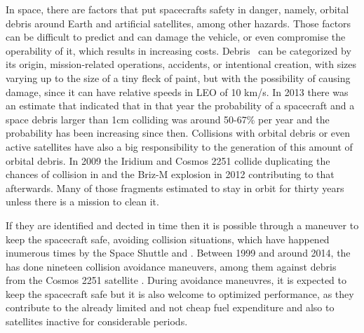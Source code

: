 In space, there are factors that put spacecrafts safety in danger, namely, orbital debris around Earth and artificial satellites, among other hazards. Those factors can be difficult to predict and can damage the vehicle, or even compromise the operability of it, which results in increasing costs. Debris~\cite{hall2014history} can be categorized by its origin, mission-related operations, accidents, or intentional creation, with sizes varying up to the size of a tiny fleck of paint, but with the possibility of causing damage, since it can have relative speeds in LEO of 10 km/s. In 2013 there was an estimate that indicated that in that year the probability of a spacecraft and a space debris larger than 1cm colliding was around 50-67\% \cite{sorokin2013earth} per year and the probability has been increasing since then. Collisions with orbital debris or even active satellites have also a big responsibility to the generation of this amount of orbital debris. In 2009 the Iridium and Cosmos 2251 collide duplicating the chances of collision in  \cite{wright2010current} and the Briz-M explosion in 2012 contributing to that afterwards\cite{hall2014history}. Many of those fragments estimated to stay in orbit for thirty years \cite{wang2010analysis} unless there is a mission to clean it. \par 

If they are identified and dected in time then it is possible through a maneuver to keep the spacecraft safe, avoiding collision situations, which have happened inumerous times by the Space Shuttle and . Between 1999 and around 2014, the  has done nineteen collision avoidance maneuvers, among them against debris from the Cosmos 2251 satellite \cite{hall2014history}. During avoidance maneuvres, it is expected to keep the spacecraft safe but it is also welcome to optimized performance, as they contribute to the already limited and not cheap fuel expenditure and also to satellites inactive for considerable periods. \par


